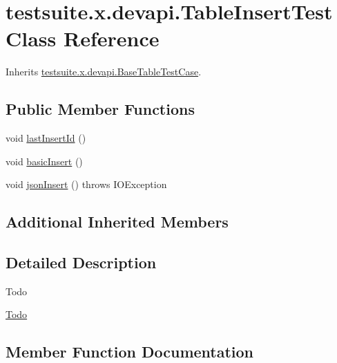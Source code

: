 \hypertarget{classtestsuite_1_1x_1_1devapi_1_1_table_insert_test}{}\section{testsuite.\+x.\+devapi.\+Table\+Insert\+Test Class Reference}
\label{classtestsuite_1_1x_1_1devapi_1_1_table_insert_test}


Inherits \mbox{\hyperlink{classtestsuite_1_1x_1_1devapi_1_1_base_table_test_case}{testsuite.\+x.\+devapi.\+Base\+Table\+Test\+Case}}.

\subsection*{Public Member Functions}
\begin{DoxyCompactItemize}
\item 
void \mbox{\hyperlink{classtestsuite_1_1x_1_1devapi_1_1_table_insert_test_a2d64d9c5ab05ed9b0aee79822f4da8f1}{last\+Insert\+Id}} ()
\item 
void \mbox{\hyperlink{classtestsuite_1_1x_1_1devapi_1_1_table_insert_test_a6ecbc4c48d9b0b4b1df6013c2cf30ead}{basic\+Insert}} ()
\item 
void \mbox{\hyperlink{classtestsuite_1_1x_1_1devapi_1_1_table_insert_test_ae19a2dfa061c082bbd792e5ddffaf3fc}{json\+Insert}} ()  throws I\+O\+Exception 
\end{DoxyCompactItemize}
\subsection*{Additional Inherited Members}


\subsection{Detailed Description}
\begin{DoxyRefDesc}{Todo}
\item[\mbox{\hyperlink{todo__todo000009}{Todo}}]\end{DoxyRefDesc}


\subsection{Member Function Documentation}
\mbox{\label{classtestsuite_1_1x_1_1devapi_1_1_table_insert_test_a6ecbc4c48d9b0b4b1df6013c2cf30ead}} 

